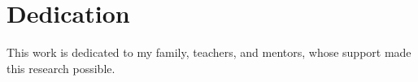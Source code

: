\chapter*{Dedication}

This work is dedicated to my family, teachers, and mentors, whose support made this research possible.
